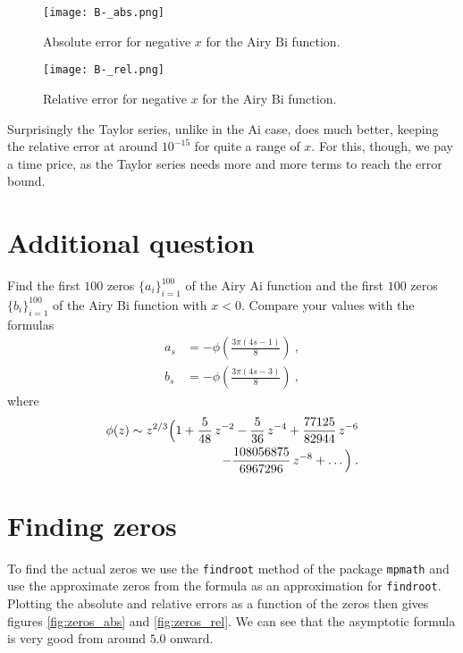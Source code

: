 \documentclass[10pt,a4paper,twocolumn]{article}
\newcommand{\Ai}{\mathrm{Ai}}
\newcommand{\Bi}{\mathrm{Bi}}
\begin{document}
\begin{figure}[H]
\centering
\captionsetup{justification=centering}
\texttt{[image: B-\_abs.png]}
\caption{Absolute error for negative $x$ for the Airy $\Bi$ function.}
\label{fig:B-_abs}
\end{figure}

\begin{figure}[H]
\centering
\captionsetup{justification=centering}
\texttt{[image: B-\_rel.png]}
\caption{Relative error for negative $x$ for the Airy $\Bi$ function.}
\label{fig:B-_rel}
\end{figure}

Surprisingly the Taylor series, unlike in the $\Ai$ case, does much better, keeping the relative error at around $10^{-15}$ for quite a range of $x$. For this, though, we pay a time price, as the Taylor series needs more and more terms to reach the error bound.


\section{Additional question}

Find the first $100$ zeros $\{a_i\}_{i=1}^{100}$ of the Airy $\Ai$ function and the first $100$ zeros $\{b_i\}_{i=1}^{100}$ of the Airy $\Bi$ function with $x<0$. Compare your values with the formulas
%
\begin{align}
  a_s &= - \phi \left( \frac{3\pi(4s-1)}{8} \right) \>, \\
  b_s &= - \phi \left( \frac{3\pi(4s-3)}{8} \right) \>,
\end{align}
%
where
%
\begin{align}
\phi(z) \sim z^{2/3} \Big( 1 + \frac{5}{48} \, z^{-2}
  -\frac{5}{36} \, z^{-4}
  +\frac{77125}{82944} \, z^{-6} \notag\\
  -\frac{108056875}{6967296} \, z^{-8} + \ldots \Big) \>.
\end{align}


\section{Finding zeros}

To find the actual zeros we use the \texttt{findroot} method of the package \texttt{mpmath} and use the approximate zeros from the formula as an approximation for \texttt{findroot}. Plotting the absolute and relative errors as a function of the zeros then gives figures \ref{fig:zeros_abs} and \ref{fig:zeros_rel}. We can see that the asymptotic formula is very good from around $5.0$ onward.
\end{document}
